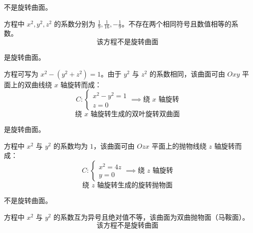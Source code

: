 \begin{solution}
     不是旋转曲面。

    方程中 $x^2, y^2, z^2$ 的系数分别为 $\frac{1}{9}, \frac{1}{16}, -\frac{1}{9}$。不存在两个相同符号且数值相等的系数。
    \begin{equation}
        \boxed{\text{该方程不是旋转曲面}}
    \end{equation}

     是旋转曲面。

    方程可写为 $x^2 - (y^2 + z^2) = 1$。由于 $y^2$ 与 $z^2$ 的系数相同，该曲面可由 $Oxy$ 平面上的双曲线绕 $x$ 轴旋转而成：
    \begin{equation}
        C: \begin{cases} x^2 - y^2 = 1 \\ z = 0 \end{cases} \implies \text{绕 } x \text{ 轴旋转}
    \end{equation}
    \begin{equation}
        \boxed{\text{绕 } x \text{ 轴旋转生成的双叶旋转双曲面}}
    \end{equation}

     是旋转曲面。

    方程中 $x^2$ 与 $y^2$ 的系数均为 $1$，该曲面可由 $Ozx$ 平面上的抛物线绕 $z$ 轴旋转而成：
    \begin{equation}
        C: \begin{cases} x^2 = 4z \\ y = 0 \end{cases} \implies \text{绕 } z \text{ 轴旋转}
    \end{equation}
    \begin{equation}
        \boxed{\text{绕 } z \text{ 轴旋转生成的旋转抛物面}}
    \end{equation}

     不是旋转曲面。

    方程中 $x^2$ 与 $y^2$ 的系数互为异号且绝对值不等，该曲面为双曲抛物面（马鞍面）。
    \begin{equation}
        \boxed{\text{该方程不是旋转曲面}}
    \end{equation}
\end{solution}


